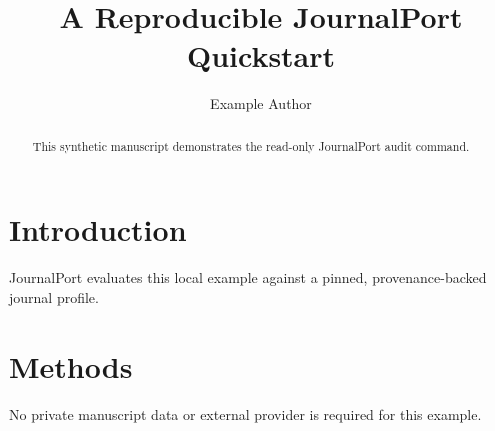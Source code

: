 \documentclass{article}
\title{A Reproducible JournalPort Quickstart}
\author{Example Author}
\begin{document}
\maketitle
\begin{abstract}
This synthetic manuscript demonstrates the read-only JournalPort audit command.
\end{abstract}
\section{Introduction}
JournalPort evaluates this local example against a pinned, provenance-backed journal profile.
\section{Methods}
No private manuscript data or external provider is required for this example.
\end{document}
